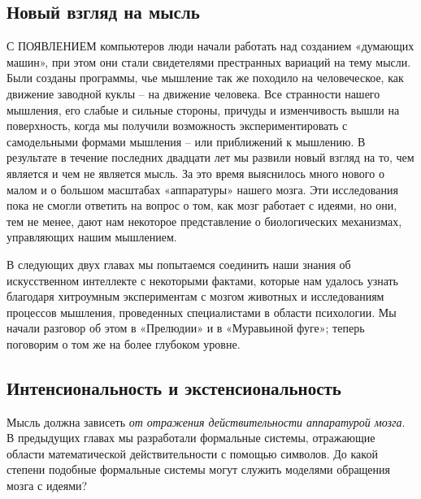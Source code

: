 \documentclass[../main.tex]{subfiles}
\begin{document}

\subsection{Новый взгляд на мысль}

С ПОЯВЛЕНИЕМ компьютеров люди начали работать над созданием «думающих машин», при этом они стали свидетелями престранных вариаций на тему мысли. Были созданы программы, чье мышление так же походило на человеческое, как движение заводной куклы \--- на движение человека. Все странности нашего мышления, его слабые и сильные стороны, причуды и изменчивость вышли на поверхность, когда мы получили возможность экспериментировать с самодельными формами мышления \--- или приближений к мышлению. В результате в течение последних двадцати лет мы развили новый взгляд на то, чем является и чем не является мысль. За это время выяснилось много нового о малом и о большом масштабах «аппаратуры» нашего мозга. Эти исследования пока не смогли ответить на вопрос о том, как мозг работает с идеями, но они, тем не менее, дают нам некоторое представление о биологических механизмах, управляющих нашим мышлением.

В следующих двух главах мы попытаемся соединить наши знания об искусственном интеллекте с некоторыми фактами, которые нам удалось узнать благодаря хитроумным экспериментам с мозгом животных и исследованиям процессов мышления, проведенных специалистами в области психологии. Мы начали разговор об этом в «Прелюдии» и в «Муравьиной фуге»; теперь поговорим о том же на более глубоком уровне.


\subsection{Интенсиональность и экстенсиональность}

Мысль должна зависеть \emph{от отражения действительности аппаратурой мозга}. В предыдущих главах мы разработали формальные системы, отражающие области математической действительности с помощью символов. До какой степени подобные формальные системы могут служить моделями обращения мозга с идеями?
\end{document}
